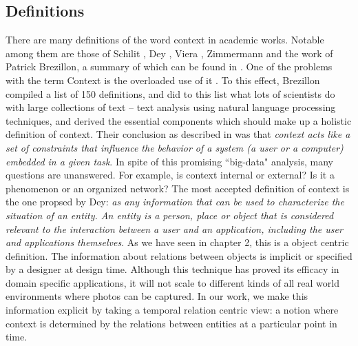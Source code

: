 \subsection{Definitions}
There are many definitions of the word context in academic works. Notable among them are those of Schilit \cite{schilit1994context}, Dey \cite{dey2001understanding}, Viera \cite{vieira2011designing}, Zimmermann \cite{zimmermann2007operational} and the work of Patrick Brezillon, a summary of which can be found in \cite{mostefaoui2004context}. One of the problems with the term Context is the overloaded use of it \cite{henricksen2002modeling}. To this effect, Brezillon compiled a list of 150 definitions, and did to this list what lots of scientists do with large collections of text -- text analysis using natural language processing techniques, and derived the essential components which should make up a holistic definition of context. Their conclusion as described in \cite{bazire2005understanding} was that \textit{context acts like a set of constraints that influence the behavior of a system (a user or a computer) embedded in a given task}. In spite of this promising ``big-data" analysis, many questions are unanswered. For example, is context internal or external? Is it a phenomenon or an organized network? The most accepted definition of context is the one propsed by Dey: \textit{as any information that can be used to characterize the situation of an entity. An entity is a person, place or object that is considered relevant to the interaction between a user and an application, including the user and applications themselves}. As we have seen in chapter 2, this is a object centric definition. The information about relations between objects is implicit or specified by a designer at design time. Although this technique has proved its efficacy in domain specific applications, it will not scale to different kinds of all real world environments where photos can be captured. In our work, we make this information explicit by taking a temporal relation centric view: a notion where context is determined by the relations between entities at a particular point in time.


